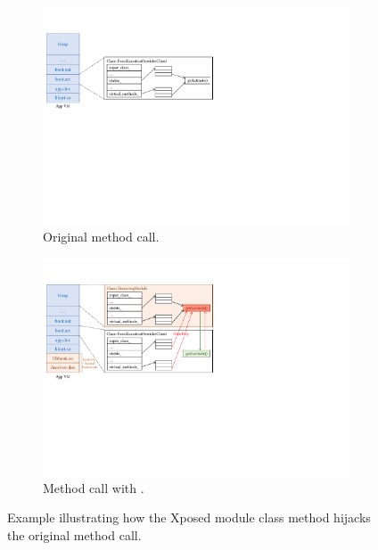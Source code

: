 \begin{figure}[t]
    \centering
    \begin{subfigure}{0.48\linewidth}
        \vspace{7mm}
        \includegraphics[width=\linewidth]{Figures/Background/virtual_memory_without_deceiver.pdf}
        \caption{Original method call.}
        \label{fig:vrtulMemMthdCall_woFr}
    \end{subfigure}
    \begin{subfigure}{0.48\linewidth}
        \includegraphics[width=\linewidth]{Figures/Background/virtual_memory_with_deceiver.pdf}
        \caption{Method call with \framework{}.}
        \label{fig:vrtulMemMthdCall_wFr}
    \end{subfigure}
    \caption{Example illustrating how the Xposed module class method hijacks the original method call.}
    \label{fig:vrtulMemMthdCall}
\end{figure}

